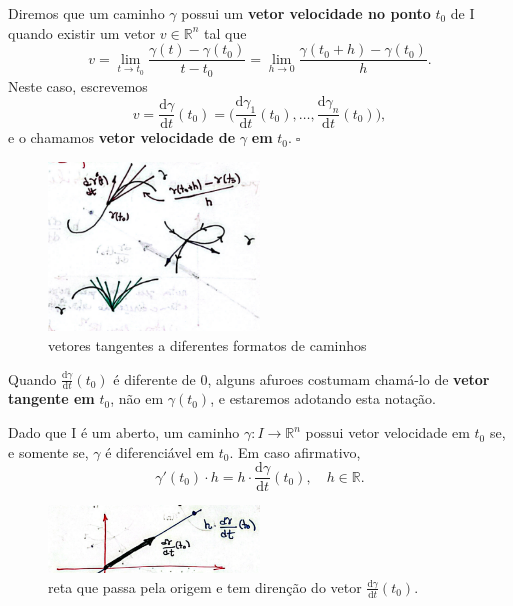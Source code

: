 \documentclass[../analysisII_notes.tex]{subfiles}
\begin{document}
\begin{def*}
	Diremos que um caminho \(\gamma \) possui um \textbf{vetor velocidade no ponto }\(t_{0}\) de I quando existir um vetor \(v\in \mathbb{R}^{n}\) tal que
	\[
		v = \lim_{t\to t_{0}}\frac{\gamma(t)-\gamma(t_{0})}{t-t_{0}} = \lim_{h\to 0}\frac{\gamma(t_{0}+h) - \gamma(t_{0})}{h}.
	\]
	Neste caso, escrevemos
	\[
		v = \frac{\mathrm{d}\gamma }{\mathrm{d}t}(t_{0}) = \biggl(\frac{\mathrm{d}\gamma_1}{\mathrm{d}t}(t_{0}), \dotsc , \frac{\mathrm{d}\gamma_{n}}{\mathrm{d}t}(t_{0})\biggr),
	\]
	e o chamamos \textbf{vetor velocidade de }\(\gamma \)\textbf{ em }\(t_{0}.\; \square\)
\end{def*}
\begin{figure}[H]
	\begin{center}
		\includegraphics[height=0.5\textheight, width=0.5\textwidth, keepaspectratio]{./Images/tangent_vectors_25.png}
	\end{center}
	\caption{vetores tangentes a diferentes formatos de caminhos}
\end{figure}

\begin{tcolorbox}[
		skin=enhanced,
		title=Observação,
		fonttitle=\bfseries,
		colframe=black,
		colbacktitle=cyan!75!white,
		colback=cyan!15,
		colbacklower=black,
		coltitle=black,
		drop fuzzy shadow,
	]
	Quando \(\frac{\mathrm{d}\gamma }{\mathrm{d}t}(t_{0})\) é diferente de 0, alguns afuroes costumam chamá-lo de \textbf{vetor tangente em }\(t_{0}\), não em \(\gamma(t_{0})\), e estaremos adotando esta notação.
\end{tcolorbox}
\begin{prop*}
	Dado que I é um aberto, um caminho \(\gamma :I\rightarrow \mathbb{R}^{n}\) possui vetor velocidade em \(t_{0}\) se, e somente se, \(\gamma \) é diferenciável em \(t_{0}\). Em caso afirmativo,
	\[
		\gamma'(t_{0})\cdot h = h \cdot \frac{\mathrm{d}\gamma }{\mathrm{d}t}(t_{0}),\quad h\in \mathbb{R}.
	\]
\end{prop*}
\begin{figure}[H]
	\begin{center}
		\includegraphics[height=0.5\textheight, width=0.5\textwidth, keepaspectratio]{./Images/directed_velocity_25.png}
	\end{center}
	\caption{reta que passa pela origem e tem direnção do vetor \(\frac{\mathrm{d}\gamma }{\mathrm{d}t}(t_{0})\).}
\end{figure}
\end{document}
